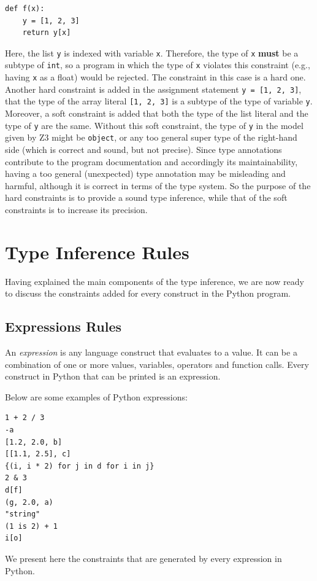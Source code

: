 \begin{lstlisting}
def f(x):
	y = [1, 2, 3]
	return y[x]
\end{lstlisting}

Here, the list \lstinline|y| is indexed with variable \lstinline|x|. Therefore, the type of \lstinline|x| \textbf{must} be a subtype of \lstinline|int|, so a program in which the type of \lstinline|x| violates this constraint (e.g., having \lstinline|x| as a float) would be rejected. The constraint in this case is a hard one. Another hard constraint is added in the assignment statement \lstinline|y = [1, 2, 3]|, that the type of the array literal \lstinline|[1, 2, 3]| is a subtype of the type of variable \lstinline|y|. Moreover, a soft constraint is added that both the type of the list literal and the type of \lstinline|y| are the same. Without this soft constraint, the type of \lstinline|y| in the model given by Z3 might be \lstinline|object|, or any too general super type of the right-hand side (which is correct and sound, but not precise). Since type annotations contribute to the program documentation and accordingly its maintainability, having a too general (unexpected) type annotation may be misleading and harmful, although it is correct in terms of the type system. So the purpose of the hard constraints is to provide a sound type inference, while that of the soft constraints is to increase its precision.
\section{Type Inference Rules}\label{sec:rules}
Having explained the main components of the type inference, we are now ready to discuss the constraints added for every construct in the Python program.
\subsection{Expressions Rules}\label{sec:exp_rules}
An \textit{expression} is any language construct that evaluates to a value. It can be a combination of one or more values, variables, operators and function calls. Every construct in Python that can be printed is an expression.

Below are some examples of Python expressions:
\begin{lstlisting}
1 + 2 / 3
-a
[1.2, 2.0, b]
[[1.1, 2.5], c]
{(i, i * 2) for j in d for i in j}
2 & 3
d[f]
(g, 2.0, a)
"string"
(1 is 2) + 1
i[o]
\end{lstlisting}

We present here the constraints that are generated by every expression in Python.

